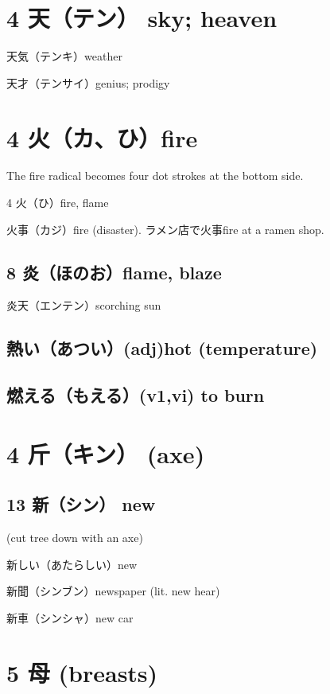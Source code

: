 \section{4 天（テン） sky; heaven}

天気（テンキ）weather

天才（テンサイ）genius; prodigy

\section{4 火（カ、ひ）fire}

The fire radical becomes four dot strokes at the bottom side.

4 火（ひ）fire, flame

火事（カジ）fire (disaster).
ラメン店で火事fire at a ramen shop.

\subsection{8 炎（ほのお）flame, blaze}

炎天（エンテン）scorching sun

\subsection{熱い（あつい）(adj)hot (temperature)}

\subsection{燃える（もえる）(v1,vi) to burn}

\section{4 斤（キン） (axe)}

\subsection{13 新（シン） new}

(cut tree down with an axe)

新しい（あたらしい）new

新聞（シンブン）newspaper (lit. new hear)

新車（シンシャ）new car

\section{5 母 (breasts)}

